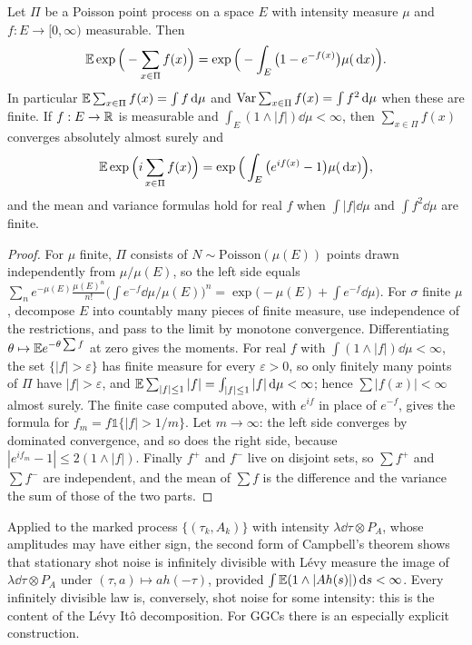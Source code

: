 \begin{theorem}[Campbell]
\label{thm:campbell}
Let $\Pi$ be a Poisson point process on a space $E$ with intensity measure $\mu$ and $f:E\to[0,\infty)$ measurable. Then
\[
\mathbb{E}\exp\Big(-\sum_{x\in\Pi}f(x)\Big) = \exp\Big(-\int_E\big(1-e^{-f(x)}\big)\mu(\,\mathrm{d} x)\Big).
\]
In particular $\mathbb{E}\sum_{x\in\Pi}f(x) = \int f\,\mathrm{d}\mu$ and $\mathrm{Var}\sum_{x\in\Pi}f(x) = \int f^2\,\mathrm{d}\mu$ when these are finite. If $f:E\to\mathbb{R}$ is measurable and $\int_E(1\wedge|f|)\dd\mu<\infty$, then $\sum_{x\in\Pi}f(x)$ converges absolutely almost surely and
\[
\mathbb{E}\exp\Big(i\sum_{x\in\Pi}f(x)\Big) = \exp\Big(\int_E\big(e^{if(x)}-1\big)\mu(\,\mathrm{d} x)\Big),
\]
and the mean and variance formulas hold for real $f$ when $\int|f|\dd\mu$ and $\int f^2\dd\mu$ are finite.
\end{theorem}

\begin{proof}
For $\mu$ finite, $\Pi$ consists of $N\sim\mathrm{Poisson}(\mu(E))$ points drawn independently from $\mu/\mu(E)$, so the left side equals $\sum_n e^{-\mu(E)}\frac{\mu(E)^n}{n!}\big(\int e^{-f}\dd\mu/\mu(E)\big)^n = \exp\big(-\mu(E) + \int e^{-f}\dd\mu\big)$. For $\sigma$ finite $\mu$, decompose $E$ into countably many pieces of finite measure, use independence of the restrictions, and pass to the limit by monotone convergence. Differentiating $\theta\mapsto\mathbb{E} e^{-\theta\sum f}$ at zero gives the moments. For real $f$ with $\int(1\wedge|f|)\dd\mu<\infty$, the set $\{|f|>\varepsilon\}$ has finite measure for every $\varepsilon>0$, so only finitely many points of $\Pi$ have $|f|>\varepsilon$, and $\mathbb{E}\sum_{|f|\leq1}|f| = \int_{|f|\leq1}|f|\,\mathrm{d}\mu<\infty$; hence $\sum|f(x)|<\infty$ almost surely. The finite case computed above, with $e^{if}$ in place of $e^{-f}$, gives the formula for $f_m = f\mathbb{1}\{|f|>1/m\}$. Let $m\to\infty$: the left side converges by dominated convergence, and so does the right side, because $|e^{if_m}-1|\leq2(1\wedge|f|)$. Finally $f^+$ and $f^-$ live on disjoint sets, so $\sum f^+$ and $\sum f^-$ are independent, and the mean of $\sum f$ is the difference and the variance the sum of those of the two parts.
\end{proof}

Applied to the marked process $\{(\tau_k,A_k)\}$ with intensity $\lambda\dd\tau\otimes P_A$, whose amplitudes may have either sign, the second form of Campbell's theorem shows that stationary shot noise is infinitely divisible with L\'evy measure the image of $\lambda\dd\tau\otimes P_A$ under $(\tau,a)\mapsto ah(-\tau)$, provided $\int\mathbb{E}(1\wedge|Ah(s)|)\,\mathrm{d} s<\infty$. Every infinitely divisible law is, conversely, shot noise for some intensity: this is the content of the L\'evy It\^o decomposition. For GGCs there is an especially explicit construction.

